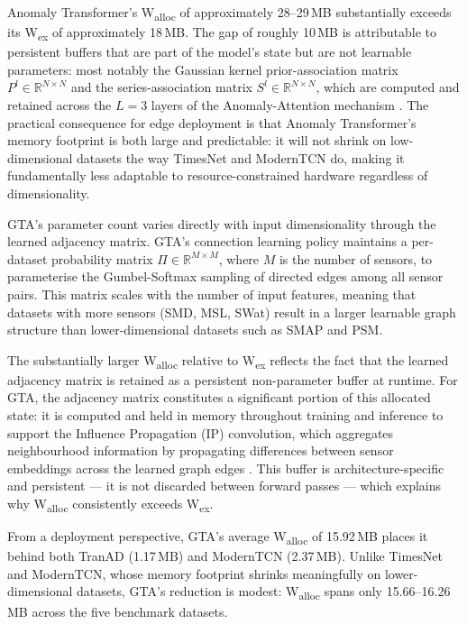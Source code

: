 \documentclass[twoside,11pt,openright]{report}
\begin{document}
Anomaly Transformer's 
W\textsubscript{alloc} of approximately 28--29\,MB substantially exceeds its 
W\textsubscript{ex} of approximately 18\,MB. The gap of roughly 10\,MB is attributable 
to persistent buffers that are part of the model's state but are not learnable parameters: 
most notably the Gaussian kernel prior-association matrix $P^l \in \mathbb{R}^{N \times N}$ 
and the series-association matrix $S^l \in \mathbb{R}^{N \times N}$, which are computed 
and retained across the $L = 3$ layers of the Anomaly-Attention mechanism 
\citep{anomalytransformer2022}.
The practical consequence for 
edge deployment is that Anomaly Transformer's memory footprint is both large and 
predictable: it will not shrink on low-dimensional datasets the way TimesNet and 
ModernTCN do, making it fundamentally less adaptable to resource-constrained hardware 
regardless of dimensionality.

GTA's parameter count
varies directly with input dimensionality through the learned
adjacency matrix. GTA's connection learning policy \citep{gta2022} maintains a
per-dataset probability matrix $\Pi \in \mathbb{R}^{M \times M}$, where $M$ is the
number of sensors, to parameterise the Gumbel-Softmax sampling of directed edges among
all sensor pairs. This matrix scales with the number of input features,
meaning that datasets with more sensors (SMD, MSL, SWat) result in a larger 
learnable graph structure than lower-dimensional
datasets such as SMAP and PSM. 

The substantially larger W\textsubscript{alloc} relative to W\textsubscript{ex} reflects
the fact that the learned adjacency matrix is retained as a persistent non-parameter
buffer at runtime. For GTA, the adjacency matrix constitutes a significant
portion of this allocated state: it is computed and held in memory throughout training
and inference to support the Influence Propagation (IP) convolution, which aggregates
neighbourhood information by propagating differences between sensor embeddings across
the learned graph edges \citep{gta2022}. This buffer is architecture-specific and
persistent --- it is not discarded between forward passes --- which explains why
W\textsubscript{alloc} consistently exceeds W\textsubscript{ex}.

From a deployment perspective, GTA's average W\textsubscript{alloc} of 15.92\,MB
places it behind both TranAD (1.17\,MB) and ModernTCN (2.37\,MB). Unlike TimesNet and
ModernTCN, whose memory footprint shrinks meaningfully on lower-dimensional datasets, 
GTA's reduction is modest:
W\textsubscript{alloc} spans only 15.66--16.26\,MB across the five benchmark datasets.
\end{document}
